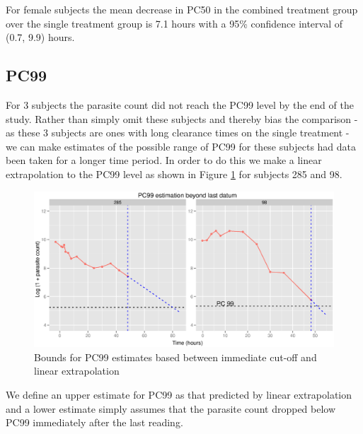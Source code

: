 For female subjects the mean decrease in PC50 in the combined treatment group over the single treatment group is 7.1 hours with a 95\% confidence interval of (0.7, 9.9) hours.

\subsection{PC99}
For 3 subjects the parasite count did not reach the PC99 level by the end of the study. Rather than simply omit these subjects and thereby bias the comparison - as these 3 subjects are ones with long clearance times on the single treatment - we can make estimates of the possible range of PC99 for these subjects had data been taken for a longer time period. In order to do this we make a linear extrapolation to the PC99 level as shown in Figure \ref{pc99extrap} for subjects 285 and 98.
\begin{figure}[h]
\includegraphics[width=150mm]{pc99extrap.eps} 
\caption{Bounds for PC99 estimates based between immediate cut-off and linear extrapolation}
\label{pc99extrap}
\end{figure}
We define an upper estimate for PC99 as that predicted by linear extrapolation and a lower estimate simply assumes that the parasite count dropped below PC99 immediately after the last reading.

